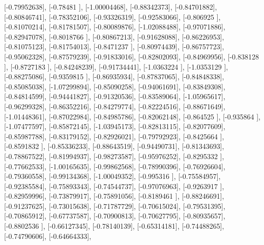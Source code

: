 \documentclass{article}
\begin{document}
       [-0.79952638],
       [-0.78481   ],
       [-1.00004468],
       [-0.88342373],
       [-0.84701882],
       [-0.80846741],
       [-0.78352106],
       [-0.93326319],
       [-0.92583066],
       [-0.806925  ],
       [-0.81070214],
       [-0.81781507],
       [-0.80089876],
       [-1.02088488],
       [-0.97071886],
       [-0.82947078],
       [-0.8018766 ],
       [-0.80867213],
       [-0.91628088],
       [-0.86226953],
       [-0.81075123],
       [-0.81754013],
       [-0.8471237 ],
       [-0.80974439],
       [-0.86757723],
       [-0.95062328],
       [-0.87579239],
       [-0.91833016],
       [-0.82802093],
       [-0.84969956],
       [-0.838128  ],
       [-0.8727183 ],
       [-0.84248239],
       [-0.91734441],
       [-1.0363224 ],
       [-1.0353129 ],
       [-0.88275086],
       [-0.9359815 ],
       [-0.86935934],
       [-0.87837065],
       [-0.84848338],
       [-0.85085038],
       [-1.07299894],
       [-0.85090258],
       [-0.94061691],
       [-0.83849308],
       [-0.84814599],
       [-0.94441827],
       [-0.91320536],
       [-0.83589064],
       [-1.05965617],
       [-0.96299328],
       [-0.86352216],
       [-0.84279774],
       [-0.82224516],
       [-0.88671649],
       [-1.01448361],
       [-0.87022984],
       [-0.84985786],
       [-0.82062148],
       [-0.864525  ],
       [-0.935864  ],
       [-1.07477597],
       [-0.85872145],
       [-1.03945173],
       [-0.82813115],
       [-0.82077609],
       [-0.85987788],
       [-0.83179152],
       [-0.82926021],
       [-0.79792923],
       [-0.8425664 ],
       [-0.8591832 ],
       [-0.85336233],
       [-0.88643519],
       [-0.94490731],
       [-0.81343693],
       [-0.78867522],
       [-0.81994937],
       [-0.98273587],
       [-0.95976252],
       [-0.8295332 ],
       [-0.77662533],
       [-1.00165635],
       [-0.99862568],
       [-0.78990396],
       [-0.76926604],
       [-0.79360558],
       [-0.99134368],
       [-1.00049352],
       [-0.995316  ],
       [-0.75584957],
       [-0.92385584],
       [-0.75893343],
       [-0.74544737],
       [-0.97076963],
       [-0.9263917 ],
       [-0.82959996],
       [-0.73879917],
       [-0.75891056],
       [-0.8189461 ],
       [-0.88246691],
       [-0.91237625],
       [-0.73015638],
       [-0.71787729],
       [-0.70615024],
       [-0.79531395],
       [-0.70865912],
       [-0.67737587],
       [-0.70900813],
       [-0.70627795],
       [-0.80935657],
       [-0.8802536 ],
       [-0.66127345],
       [-0.78140139],
       [-0.65314181],
       [-0.74488265],
       [-0.74790606],
       [-0.64664333],
\end{document}
